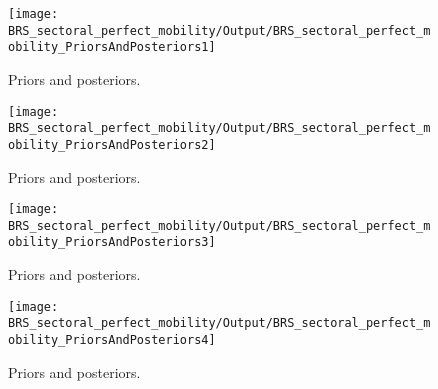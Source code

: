 
\begin{figure}[H]
\centering
\texttt{[image: BRS\_sectoral\_perfect\_mobility/Output/BRS\_sectoral\_perfect\_mobility\_PriorsAndPosteriors1]}
\caption{Priors and posteriors.}\label{Fig:PriorsAndPosteriors:1}
\end{figure}
 
\begin{figure}[H]
\centering
\texttt{[image: BRS\_sectoral\_perfect\_mobility/Output/BRS\_sectoral\_perfect\_mobility\_PriorsAndPosteriors2]}
\caption{Priors and posteriors.}\label{Fig:PriorsAndPosteriors:2}
\end{figure}
 
\begin{figure}[H]
\centering
\texttt{[image: BRS\_sectoral\_perfect\_mobility/Output/BRS\_sectoral\_perfect\_mobility\_PriorsAndPosteriors3]}
\caption{Priors and posteriors.}\label{Fig:PriorsAndPosteriors:3}
\end{figure}
 
\begin{figure}[H]
\centering
\texttt{[image: BRS\_sectoral\_perfect\_mobility/Output/BRS\_sectoral\_perfect\_mobility\_PriorsAndPosteriors4]}
\caption{Priors and posteriors.}\label{Fig:PriorsAndPosteriors:4}
\end{figure}
 
